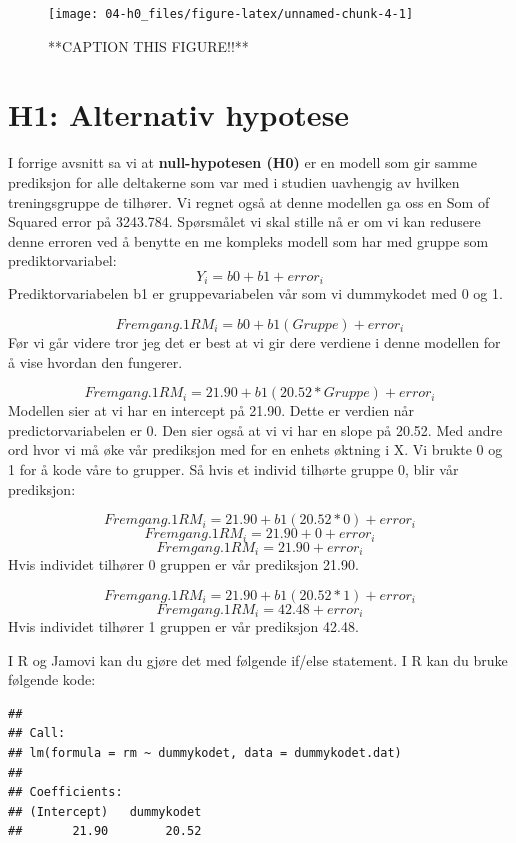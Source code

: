 \documentclass[
]{book}
\begin{document}
\begin{figure}

{\centering \texttt{[image: 04-h0\_files/figure-latex/unnamed-chunk-4-1]} 

}

\caption{**CAPTION THIS FIGURE!!**}\label{fig:unnamed-chunk-4}
\end{figure}

\hypertarget{h1-alternativ-hypotese}{%
\section{H1: Alternativ hypotese}\label{h1-alternativ-hypotese}}

I forrige avsnitt sa vi at \textbf{null-hypotesen (H0)} er en modell som gir samme prediksjon for alle deltakerne som var med i studien uavhengig av hvilken treningsgruppe de tilhører. Vi regnet også at denne modellen ga oss en Som of Squared error på 3243.784. Spørsmålet vi skal stille nå er om vi kan redusere denne erroren ved å benytte en me kompleks modell som har med gruppe som prediktorvariabel:
\[
Y_i = b0 + b1 + error_i
\]
Prediktorvariabelen b1 er gruppevariabelen vår som vi dummykodet med 0 og 1.

\[
Fremgang.1RM_i = b0 + b1(Gruppe) + error_i
\]
Før vi går videre tror jeg det er best at vi gir dere verdiene i denne modellen for å vise hvordan den fungerer.

\[
Fremgang.1RM_i = 21.90 + b1(20.52*Gruppe) + error_i
\]
Modellen sier at vi har en intercept på 21.90. Dette er verdien når predictorvariabelen er 0. Den sier også at vi vi har en slope på 20.52. Med andre ord hvor vi må øke vår prediksjon med for en enhets øktning i X. Vi brukte 0 og 1 for å kode våre to grupper. Så hvis et individ tilhørte gruppe 0, blir vår prediksjon:

\[
Fremgang.1RM_i = 21.90 + b1(20.52*0) + error_i
\]
\[
Fremgang.1RM_i = 21.90 + 0 + error_i
\]
\[
Fremgang.1RM_i = 21.90 + error_i
\]
Hvis individet tilhører 0 gruppen er vår prediksjon 21.90.

\[
Fremgang.1RM_i = 21.90 + b1(20.52*1) + error_i
\]
\[
Fremgang.1RM_i = 42.48 + error_i
\]
Hvis individet tilhører 1 gruppen er vår prediksjon 42.48.

I R og Jamovi kan du gjøre det med følgende if/else statement. I R kan du bruke følgende kode:

\begin{verbatim}
## 
## Call:
## lm(formula = rm ~ dummykodet, data = dummykodet.dat)
## 
## Coefficients:
## (Intercept)   dummykodet  
##       21.90        20.52
\end{verbatim}
\end{document}

